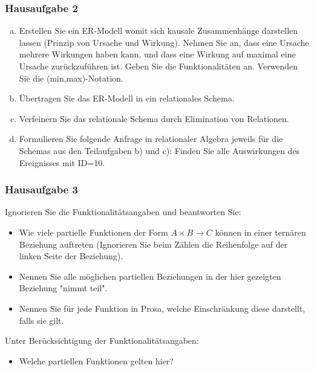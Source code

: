 \begin{frame}
	\frametitle{Hausaufgabe 2}
	\vspace{0.25cm}

	\begin{enumerate}[a)]
		\item Erstellen Sie ein ER-Modell womit sich kausale Zusammenhänge
		      darstellen lassen (Prinzip von Ursache und Wirkung).
		      Nehmen Sie an, dass eine Ursache mehrere Wirkungen haben kann,
		      und dass eine Wirkung auf maximal eine Ursache zurückzuführen ist.
		      Geben Sie die Funktionalitäten an. Verwenden Sie die (min,max)-Notation.
		\item Übertragen Sie das ER-Modell in ein relationales Schema.
		\item Verfeinern Sie das relationale Schema durch Elimination von Relationen.
		\item Formulieren Sie folgende Anfrage in relationaler Algebra jeweils für die Schemas
		      aus den Teilaufgaben b) und c): Finden Sie alle Auswirkungen des Ereignisses mit ID=10.
	\end{enumerate}
\end{frame}

\begin{frame}
	\frametitle{Hausaufgabe 3}
	\vspace{0.25cm}

	Ignorieren Sie die Funktionalitätsangaben und beantworten Sie:
	\begin{itemize}
		\item Wie viele partielle Funktionen der Form \( A \times B \rightarrow C \)
		      können in einer ternären Beziehung auftreten
		      (Ignorieren Sie beim Zählen die Reihenfolge auf der linken Seite der Beziehung).
		\item Nennen Sie alle möglichen partiellen Beziehungen in der hier
		      gezeigten Beziehung "nimmt teil".
		\item Nennen Sie für jede Funktion in Prosa,
		      welche Einschränkung diese darstellt, falls sie gilt.
	\end{itemize}
	Unter Berücksichtigung der Funktionalitätsangaben:
	\begin{itemize}
		\item Welche partiellen Funktionen gelten hier?
	\end{itemize}
\end{frame}

